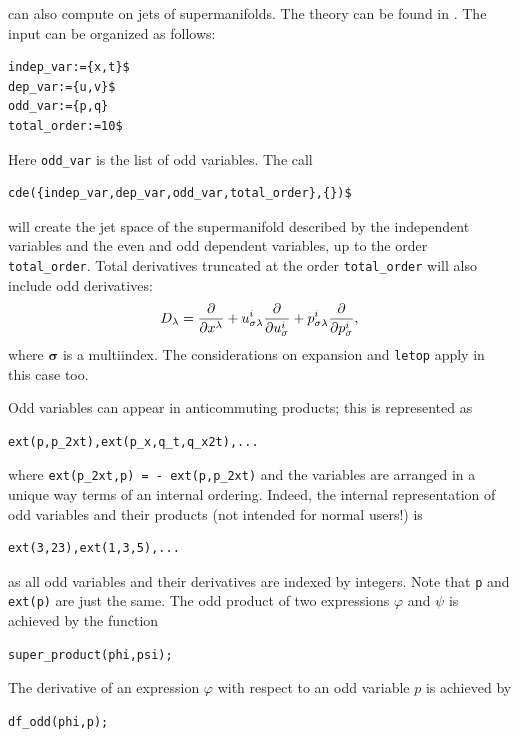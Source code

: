 \hypertarget{variable:ODD_VAR}{}
\cde can also compute on jets of supermanifolds. The theory can be found in
\cite{IgoninVerbovetskyVitolo:2004,KerstenKrasilshchikVerboretsky:2004,KrasilshchikVerbovetsky:JGP:2011}. The input can be organized as follows:
\begin{verbatim}
indep_var:={x,t}$
dep_var:={u,v}$
odd_var:={p,q}
total_order:=10$
\end{verbatim}
Here \texttt{odd\_var} is the list of odd variables. The call
\begin{verbatim}
cde({indep_var,dep_var,odd_var,total_order},{})$
\end{verbatim}
will create the jet space of the supermanifold described by the independent
variables and the even and odd dependent variables, up to the order
\texttt{total\_order}. Total derivatives truncated at the order
\texttt{total\_order} will also include odd derivatives:
\begin{equation}
  D_\lambda=\pd{}{x^\lambda} +
  u^i_{\mathbf{\sigma}\lambda}\pd{}{u^i_{\mathbf{\sigma}}}
    + p^i_{\mathbf{\sigma}\lambda}\pd{}{p^i_{\mathbf{\sigma}}},
\end{equation}
where $\mathbf{\sigma}$ is a multiindex. The considerations on
expansion and \texttt{letop} apply in this case too.

\hypertarget{operator:EXT}{}
Odd variables can appear in anticommuting products; this is represented as
\begin{verbatim}
ext(p,p_2xt),ext(p_x,q_t,q_x2t),...
\end{verbatim}
where \texttt{ext(p\_2xt,p) = - ext(p,p\_2xt)} and the variables are arranged
in a unique way terms of an internal ordering. Indeed, the internal
representation of odd variables and their products (not intended for normal
users!) is
\begin{verbatim}
ext(3,23),ext(1,3,5),...
\end{verbatim}
as all odd variables and their derivatives are indexed by integers.
\hypertarget{operator:SUPER_PRODUCT}{}
Note that \texttt{p} and \texttt{ext(p)} are just the same. The odd product of
two expressions $\varphi$ and $\psi$ is achieved by the \cdiff function
\begin{verbatim}
super_product(phi,psi);
\end{verbatim}
The derivative of an expression $\varphi$ with respect to an odd variable $p$
is achieved by
\hypertarget{operator:DF_ODD}{}
\begin{verbatim}
df_odd(phi,p);
\end{verbatim}

